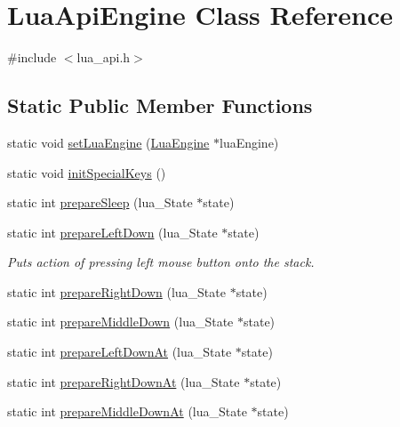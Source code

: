 \hypertarget{class_lua_api_engine}{\section{Lua\-Api\-Engine Class Reference}
\label{class_lua_api_engine}
}


{\ttfamily \#include $<$lua\-\_\-api.\-h$>$}

\subsection*{Static Public Member Functions}
\begin{DoxyCompactItemize}
\item 
static void \hyperlink{class_lua_api_engine_ae3642a4f6256f202dd88726b70ed3936}{set\-Lua\-Engine} (\hyperlink{class_lua_engine}{Lua\-Engine} $\ast$lua\-Engine)
\item 
static void \hyperlink{class_lua_api_engine_a7f614e9a85e02951c0a21e694654b83a}{init\-Special\-Keys} ()
\item 
static int \hyperlink{class_lua_api_engine_a03308524bb7be3fca0e5865a0eba6c41}{prepare\-Sleep} (lua\-\_\-\-State $\ast$state)
\item 
static int \hyperlink{class_lua_api_engine_a5e6c9c1b66d19a4f65d6c65d6ae849a2}{prepare\-Left\-Down} (lua\-\_\-\-State $\ast$state)
\begin{DoxyCompactList}\small\item\em Puts action of pressing left mouse button onto the stack. \end{DoxyCompactList}\item 
static int \hyperlink{class_lua_api_engine_a9975cd495e847300968ce6149846c2f9}{prepare\-Right\-Down} (lua\-\_\-\-State $\ast$state)
\item 
static int \hyperlink{class_lua_api_engine_a5cd6791cd7b80bb58c0e917f1c35369c}{prepare\-Middle\-Down} (lua\-\_\-\-State $\ast$state)
\item 
static int \hyperlink{class_lua_api_engine_a15078a5e7a8cedb80f088703b587ec81}{prepare\-Left\-Down\-At} (lua\-\_\-\-State $\ast$state)
\item 
static int \hyperlink{class_lua_api_engine_a1798695ce32c9d6526a8818535dbc7cf}{prepare\-Right\-Down\-At} (lua\-\_\-\-State $\ast$state)
\item 
static int \hyperlink{class_lua_api_engine_a6862d91bd6f2a46f7a86f0a5d19c7545}{prepare\-Middle\-Down\-At} (lua\-\_\-\-State $\ast$state)
\item 

\end{DoxyCompactItemize}
